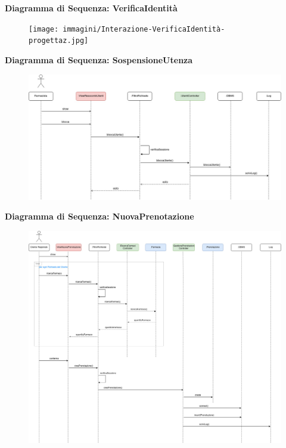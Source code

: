 \newpage
\textbf{Diagramma di Sequenza: VerificaIdentità}

\begin{figure}[h!]
    \begin{center}
        \texttt{[image: immagini/Interazione-VerificaIdentità-progettaz.jpg]}
    \end{center}
\end{figure}

\textbf{Diagramma di Sequenza: SospensioneUtenza}
\begin{figure}[h!]
    \begin{center}
        \includegraphics[width=\textwidth]{immagini/Interazione-SospensioneUtenza-progettaz.jpg}
    \end{center}
\end{figure}


\newpage

\textbf{Diagramma di Sequenza: NuovaPrenotazione}
\begin{figure}[h!]
    \begin{center}
        \includegraphics[width=\textwidth]{immagini/Interazione-NuovaPrenotazione-progettaz.jpg}
    \end{center}
\end{figure}

